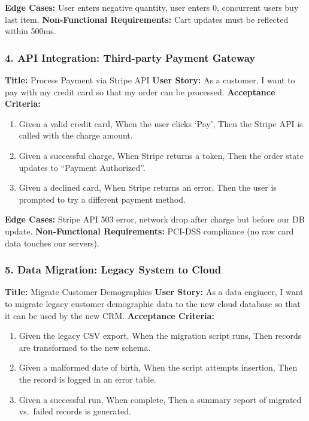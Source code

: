 \textbf{Edge Cases:} User enters negative quantity, user enters 0,
concurrent users buy last item. \textbf{Non-Functional Requirements:}
Cart updates must be reflected within 500ms.

\subsubsection{4. API Integration: Third-party Payment
Gateway}\label{api-integration-third-party-payment-gateway}

\textbf{Title:} Process Payment via Stripe API \textbf{User Story:} As a
customer, I want to pay with my credit card so that my order can be
processed. \textbf{Acceptance Criteria:}

\begin{enumerate}
\def\labelenumi{\arabic{enumi}.}
\tightlist
\item
  Given a valid credit card, When the user clicks `Pay', Then the Stripe
  API is called with the charge amount.
\item
  Given a successful charge, When Stripe returns a token, Then the order
  state updates to ``Payment Authorized''.
\item
  Given a declined card, When Stripe returns an error, Then the user is
  prompted to try a different payment method.
\end{enumerate}

\textbf{Edge Cases:} Stripe API 503 error, network drop after charge but
before our DB update. \textbf{Non-Functional Requirements:} PCI-DSS
compliance (no raw card data touches our servers).

\subsubsection{5. Data Migration: Legacy System to
Cloud}\label{data-migration-legacy-system-to-cloud}

\textbf{Title:} Migrate Customer Demographics \textbf{User Story:} As a
data engineer, I want to migrate legacy customer demographic data to the
new cloud database so that it can be used by the new CRM.
\textbf{Acceptance Criteria:}

\begin{enumerate}
\def\labelenumi{\arabic{enumi}.}
\tightlist
\item
  Given the legacy CSV export, When the migration script runs, Then
  records are transformed to the new schema.
\item
  Given a malformed date of birth, When the script attempts insertion,
  Then the record is logged in an error table.
\item
  Given a successful run, When complete, Then a summary report of
  migrated vs.~failed records is generated.
\end{enumerate}

